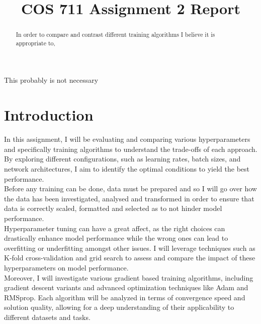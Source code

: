 \documentclass[conference]{IEEEtran}
\begin{document}
\title{COS 711 Assignment 2 Report\\
}

\author{
}

\maketitle

\begin{abstract}
In order to compare and contrast different training algorithms I believe it is appropriate to, 
\end{abstract}

\begin{IEEEkeywords}
This probably is not necessary
\end{IEEEkeywords}

\section{Introduction}
In this assignment, I will be evaluating and comparing various hyperparameters and specifically training algorithms to understand the trade-offs of each approach. By exploring different configurations, such as learning rates, batch sizes, and network architectures, I aim to identify the optimal conditions to yield the best performance.\\

Before any training can be done, data must be prepared and so I will go over how the data has been investigated, analysed and transformed in order to ensure that data is correctly scaled, formatted and selected as to not hinder model performance.\\

Hyperparameter tuning can have a great affect, as the right choices can drastically enhance model performance while the wrong ones can lead to overfitting or underfitting amongst other issues. I will leverage techniques such as K-fold cross-validation and grid search to assess and compare the impact of these hyperparameters on model performance.\\

Moreover, I will investigate various gradient based training algorithms, including gradient descent variants and advanced optimization techniques like Adam and RMSprop. Each algorithm will be analyzed in terms of convergence speed and solution quality, allowing for a deep understanding of their applicability to different datasets and tasks.\\
\end{document}
